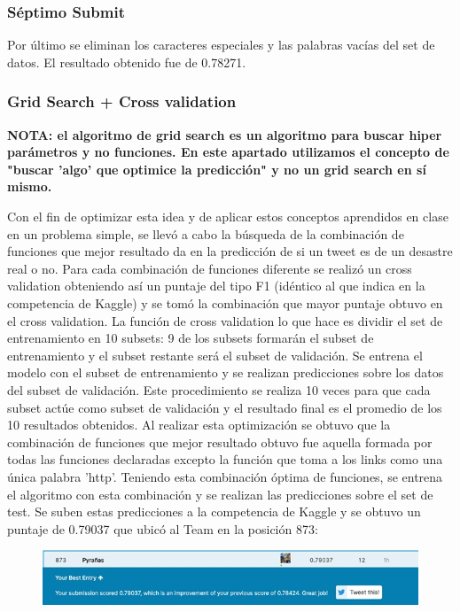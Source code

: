 \documentclass[12pt]{article}
\begin{document}
\subsubsection{Séptimo Submit}
Por último se eliminan los caracteres especiales y las palabras vacías del set de datos.
El resultado obtenido fue de 0.78271.


\subsubsection{Grid Search + Cross validation}
\textbf{NOTA: el algoritmo de grid search es un algoritmo para buscar hiper parámetros y no funciones. En este apartado utilizamos el concepto de "buscar 'algo' que optimice la predicción" y no un grid search en sí mismo.\\}

Con el fin de optimizar esta idea y de aplicar estos conceptos aprendidos en clase en un problema simple, se llevó a cabo la búsqueda de la combinación de funciones que mejor resultado da en la predicción de si un tweet es de un desastre real o no.
Para cada combinación de funciones diferente se realizó un cross validation obteniendo así un puntaje del tipo F1 (idéntico al que indica en la competencia de Kaggle) y se tomó la combinación que mayor puntaje obtuvo en el cross validation.
La función de cross validation lo que hace es dividir el set de entrenamiento en 10 subsets: 9 de los subsets formarán el subset de entrenamiento y el subset restante será el subset de validación.
Se entrena el modelo con el subset de entrenamiento y se realizan predicciones sobre los datos del subset de validación. Este procedimiento se realiza 10 veces para que cada subset actúe como subset de validación y el resultado final es el promedio de los 10 resultados obtenidos.
Al realizar esta optimización se obtuvo que la combinación de funciones que mejor resultado obtuvo fue aquella formada por todas las funciones declaradas excepto la función que toma a los links como una única palabra 'http'.
Teniendo esta combinación óptima de funciones, se entrena el algoritmo con esta combinación y se realizan las predicciones sobre el set de test. Se suben estas predicciones a la competencia de Kaggle y se obtuvo un puntaje de 0.79037 que ubicó al Team en la posición 873:



\begin{figure}[H]
    \centering
    \includegraphics[scale = 0.9]{imgs/tweet_1.jpg}
    \label{tp:fig:equilibrium}
\end{figure}
\end{document}
